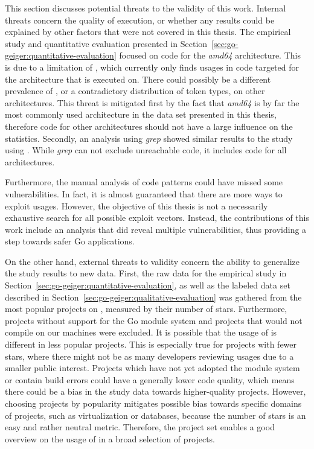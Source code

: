 This section discusses potential threats to the validity of this work.
Internal threats concern the quality of execution, or whether any results could be explained by other factors that were
not covered in this thesis.
The empirical study and quantitative evaluation presented in Section~\ref{sec:go-geiger:quantitative-evaluation}
focused on code for the \textit{amd64} architecture.
This is due to a limitation of \toolGeiger{}, which currently only finds \unsafe{} usages in code targeted for the
architecture that \toolGeiger{} is executed on.
There could possibly be a different prevalence of \unsafe{}, or a contradictory distribution of \unsafe{} token types,
on other architectures.
This threat is mitigated first by the fact that \textit{amd64} is by far the most commonly used architecture in the
data set presented in this thesis, therefore code for other architectures should not have a large influence on the
statistics.
Secondly, an analysis using \textit{grep} showed similar results to the study using \toolGeiger{}.
While \textit{grep} can not exclude unreachable code, it includes code for all architectures.

Furthermore, the manual analysis of \unsafe{} code patterns could have missed some vulnerabilities.
In fact, it is almost guaranteed that there are more ways to exploit \unsafe{} usages.
However, the objective of this thesis is not a necessarily exhaustive search for all possible exploit vectors.
Instead, the contributions of this work include an analysis that did reveal multiple vulnerabilities, thus providing a
step towards safer Go applications.

On the other hand, external threats to validity concern the ability to generalize the study results to new data.
First, the raw data for the empirical study in Section~\ref{sec:go-geiger:quantitative-evaluation}, as well as the
labeled data set described in Section~\ref{sec:go-geiger:qualitative-evaluation} was gathered from the most popular
projects on \github{}, measured by their number of stars.
Furthermore, projects without support for the Go module system and projects that would not compile on our machines were
excluded.
It is possible that the usage of \unsafe{} is different in less popular projects.
This is especially true for projects with fewer stars, where there might not be as many developers reviewing \unsafe{}
usages due to a smaller public interest.
Projects which have not yet adopted the module system or contain build errors could have a generally lower code quality,
which means there could be a bias in the study data towards higher-quality projects.
However, choosing projects by popularity mitigates possible bias towards specific domains of projects, such as
virtualization or databases, because the number of stars is an easy and rather neutral metric.
Therefore, the project set enables a good overview on the usage of \unsafe{} in a broad selection of projects.
